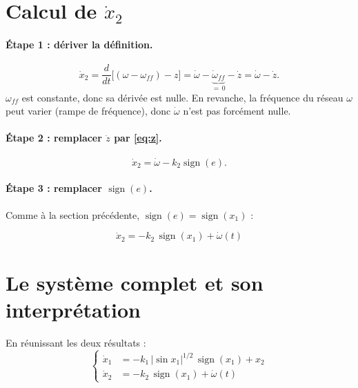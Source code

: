 \documentclass[11pt,a4paper]{article}
\newcommand{\sign}{\operatorname{sign}}
\begin{document}
\section{Calcul de $\dot x_2$}

\paragraph{Étape 1 : dériver la définition.}
\begin{equation}
\dot x_2 = \frac{d}{dt}\Big[(\omega-\omega_{ff}) - z\Big] = \dot\omega - \underbrace{\dot\omega_{ff}}_{=\,0} - \dot z = \dot\omega - \dot z .
\end{equation}
$\omega_{ff}$ est constante, donc sa dérivée est nulle. En revanche, la fréquence du réseau
$\omega$ peut varier (rampe de fréquence), donc $\dot\omega$ n'est pas forcément nulle.

\paragraph{Étape 2 : remplacer $\dot z$ par \eqref{eq:z}.}
\begin{equation}
\dot x_2 = \dot\omega - k_2\sign(e).
\end{equation}

\paragraph{Étape 3 : remplacer $\sign(e)$.} Comme à la section précédente, $\sign(e)=\sign(x_1)$ :

\begin{resultat}
\begin{equation}
\dot x_2 = -k_2\,\sign(x_1) + \dot\omega(t) \tag{18}
\end{equation}
\end{resultat}

\section{Le système complet et son interprétation}

En réunissant les deux résultats :
\begin{equation}
\left\{
\begin{aligned}
\dot x_1 &= -k_1\,|\sin x_1|^{1/2}\,\sign(x_1) + x_2 \\
\dot x_2 &= -k_2\,\sign(x_1) + \dot\omega(t)
\end{aligned}
\right.
\end{equation}
\end{document}
